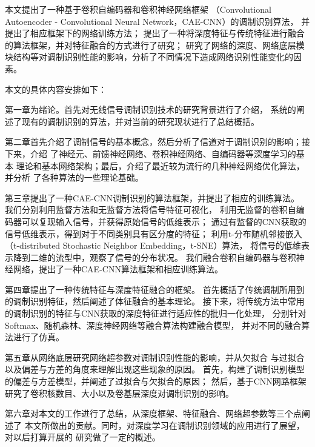 本文提出了一种基于卷积自编码器和卷积神经网络框架
（Convolutional Autoencoder - Convolutional Neural Network，CAE-CNN）的调制识别算法，
并提出了相应框架下的网络训练方法；
提出了一种将深度特征与传统特征进行融合的算法框架，并对特征融合的方式进行了研究；
研究了网络的深度、网络底层模块结构等对调制识别性能的影响，分析了不同情况下造成网络识别性能变化的因素。 \par

本文的具体内容安排如下：

第一章为绪论。首先对无线信号调制识别技术的研究背景进行了介绍，
系统的阐述了现有的调制识别的算法，并对当前的研究现状进行了总结概括。\par

第二章首先介绍了调制信号的基本概念，然后分析了信道对于调制识别的影响；接下来，介绍
了神经元、前馈神经网络、卷积神经网络、自编码器等深度学习的基本
理论和基本网络架构；最后，介绍了最近较为流行的几种神经网络优化算法，并分析
了各种算法的一些理论基础。 \par

第三章提出了一种CAE-CNN调制识别的算法框架，并提出了相应的训练算法。
我们分别利用监督方法和无监督方法将信号特征可视化，
利用无监督的卷积自编码器可以复现输入信号，并获得原始信号的低维表示；
通过有监督的CNN获取的信号低维表示，得到对于不同类别具有区分度的特征；
利用t-分布随机邻接嵌入（t-distributed Stochastic Neighbor Embedding，t-SNE）算法，
将信号的低维表示降到二维的流型中，观察了信号的分布状况。
我们融合卷积自编码器与卷积神经网络，提出了一种CAE-CNN算法框架和相应训练算法。\par

第四章提出了一种传统特征与深度特征融合的框架。
首先概括了传统调制所用到的调制识别特征，然后阐述了体征融合的基本理论。
接下来，将传统方法中常用的调制识别的特征与CNN获取的深度特征进行适应性的批归一化处理，
分别针对Softmax、随机森林、深度神经网络等融合算法构建融合模型，
并对不同的融合算法进行了仿真。 \par

第五章从网络底层研究网络超参数对调制识别性能的影响，并从欠拟合
与过拟合以及偏差与方差的角度来理解出现这些现象的原因。
首先，构建了调制识别模型的偏差与方差模型，并阐述了过拟合与欠拟合的原因；
然后，基于CNN网路框架研究了卷积核数目、大小以及卷基层深度对调制识别的影响。\par

第六章对本文的工作进行了总结，从深度框架、特征融合、网络超参数等三个点阐述了
本文所做出的贡献。同时，对深度学习在调制识别领域的应用进行了展望，对以后打算开展的
研究做了一定的概述。
\par